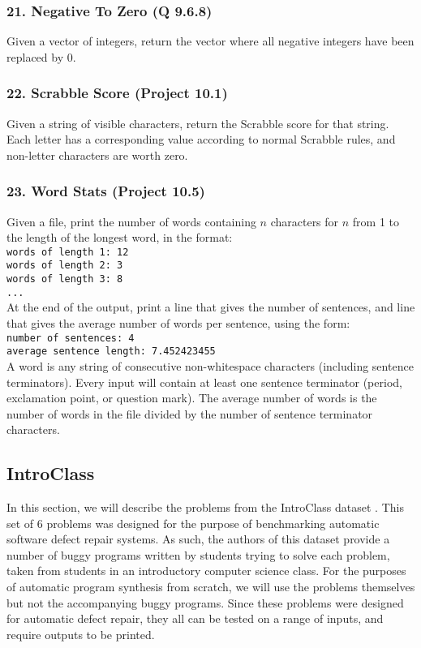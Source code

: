 \documentclass{sig-alternate}
\begin{document}
\subsubsection*{21. Negative To Zero (Q 9.6.8)}
Given a vector of integers, return the vector where all negative integers have been replaced by 0.

\subsubsection*{22. Scrabble Score (Project 10.1)}
Given a string of visible characters, return the Scrabble score for that string. Each letter has a corresponding value according to normal Scrabble rules, and non-letter characters are worth zero.

\subsubsection*{23. Word Stats (Project 10.5)}
Given a file, print the number of words containing $n$ characters for $n$ from 1 to the length of the longest word, in the format:
\texttt{ \\
words of length 1: 12 \\
words of length 2: 3 \\
words of length 3: 8 \\
... \\
} %
At the end of the output, print a line that gives the number of sentences, and line that gives the average number of words per sentence, using the form:
\texttt{ \\
number of sentences: 4 \\
average sentence length: 7.452423455 \\
} %
A word is any string of consecutive non-whitespace characters (including sentence terminators). Every input will contain at least one sentence terminator (period, exclamation point, or question mark). The average number of words is the number of words in the file divided by the number of sentence terminator characters.


\subsection{IntroClass}

In this section, we will describe the problems from the IntroClass dataset \cite{ManyBugsAndIntroClass, Brun13TRgptest}. This set of 6 problems was designed for the purpose of benchmarking automatic software defect repair systems. As such, the authors of this dataset provide a number of buggy programs written by students trying to solve each problem, taken from students in an introductory computer science class. For the purposes of automatic program synthesis from scratch, we will use the problems themselves but not the accompanying buggy programs. Since these problems were designed for automatic defect repair, they all can be tested on a range of inputs, and require outputs to be printed.
\end{document}
